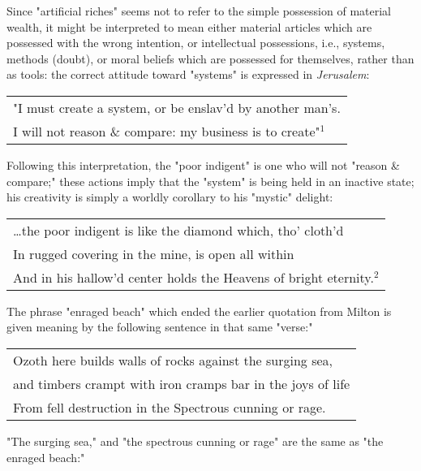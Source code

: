 Since "artificial riches" seems not to refer to the simple possession of material wealth, it might be interpreted
to mean either material articles which are possessed with the wrong intention, or intellectual
possessions, i.e., systems, methods (doubt), or moral beliefs which are possessed for themselves,
rather than as tools: the correct attitude toward "systems" is expressed in \textit{Jerusalem}:\par
\begin{center}
	\parbox{0.8\textwidth}{
		\centering
		\begin{tabular}{l}
			"I must create a system, or be enslav'd by another man's. \\
			I will not reason \& compare: my business is to create"$^{1}$
		\end{tabular}
	}%
\end{center}
\hspace*{5mm}Following this interpretation, the "poor indigent" is one who will not "reason \& compare;" these actions imply that
the "system" is being held in an inactive state; his creativity is simply a worldly
corollary to his "mystic" delight:\par
\begin{center}
	\parbox{0.8\textwidth}{
		\centering
		\begin{tabular}{l}
			\dots the poor indigent is like the diamond which, tho' cloth'd \\
			In rugged covering in the mine, is open all within              \\
			And in his hallow'd center holds the Heavens of bright eternity.$^{2}$
		\end{tabular}
	}%
\end{center}
\hspace*{5mm}The phrase "enraged beach" which ended the earlier quotation from Milton
is given meaning by the following sentence in that same "verse:"\par
\begin{center}
	\parbox{0.8\textwidth}{
		\centering
		\begin{tabular}{l}
			Ozoth here builds walls of rocks against the surging sea,   \\
			and timbers crampt with iron cramps bar in the joys of life \\
			From fell destruction in the Spectrous cunning or rage.
		\end{tabular}
	}%
\end{center}
\hspace*{5mm}"The surging sea," and "the spectrous cunning or rage" are the same as "the enraged beach:"
